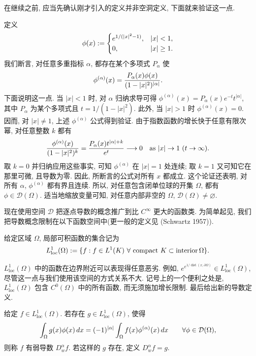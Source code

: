 在继续之前, 应当先确认刚才引入的定义并非空洞定义, 下面就来验证这一点.

\begin{Example}
\label{ex:ch01-bump-function}
定义
\[
\MathBookFormulaID{formula-ch01-bump-function}
\phi(x):=\begin{cases}
e^{1/(|x|^2-1)},&|x|<1,\\
0,&|x|\geq1.
\end{cases}
\]
我们断言, 对任意多重指标 $\alpha$, 都存在某个多项式 $P_\alpha$ 使
\[
\MathBookFormulaID{formula-ch01-bump-derivative-form}
\phi^{(\alpha)}(x)=\frac{P_\alpha(x)\phi(x)}{(1-|x|^2)^{|\alpha|}}.
\]
下面说明这一点. 当 $|x|<1$ 时, 对 $\alpha$ 归纳求导可得 $\phi^{(\alpha)}(x)=P_\alpha(x)e^{-t}t^{|\alpha|}$, 其中 $P_\alpha$ 为某个多项式且 $t=1/(1-|x|^2)$. 此外, 当 $|x|>1$ 时 $\phi^{(\alpha)}(x)=0$. 因而, 对 $|x|\neq1$, 上述 $\phi^{(\alpha)}$ 公式得到验证. 由于指数函数的增长快于任意有限次幂, 对任意整数 $k$ 都有
\[
\MathBookFormulaID{formula-ch01-bump-boundary-decay}
\frac{\phi^{(\alpha)}(x)}{(1-|x|^2)^k}
=\frac{P_\alpha(x)t^{|\alpha|+k}}{e^t}\longrightarrow0
\quad\text{as }|x|\to1\ (t\to\infty).
\]
取 $k=0$ 并归纳应用这些事实, 可知 $\phi^{(\alpha)}$ 在 $|x|=1$ 处连续; 取 $k=1$ 又可知它在那里可微, 且导数为零. 因此, 所断言的公式对所有 $x$ 都成立. 这个论证还表明, 对所有 $\alpha$, $\phi^{(\alpha)}$ 都有界且连续. 所以, 对任意包含闭单位球的开集 $\Omega$, 都有 $\phi\in\mathcal D(\Omega)$. 适当地缩放变量可知, 对任意内部非空的 $\Omega$, $\mathcal D(\Omega)\neq\varnothing$.
\end{Example}

现在使用空间 $\mathcal D$ 把逐点导数的概念推广到比 $C^\infty$ 更大的函数类. 为简单起见, 我们把导数概念限制在以下函数空间中(更一般的定义见 (Schwartz 1957)).

\begin{Definition}
\label{def:ch01-locally-integrable}
给定区域 $\Omega$, 局部可积函数的集合记为
\[
\MathBookFormulaID{formula-ch01-locally-integrable-space}
L_{\mathrm{loc}}^1(\Omega):=
\{f:f\in L^1(K)\ \forall\text{ compact }K\subset\operatorname{interior}\Omega\}.
\]
\end{Definition}

$L_{\mathrm{loc}}^1(\Omega)$ 中的函数在边界附近可以表现得任意恶劣. 例如, $e^{e^{1/\operatorname{dist}(x,\partial\Omega)}}\in L_{\mathrm{loc}}^1(\Omega)$, 尽管这一点与我们使用该空间的方式关系不大. 记号上的一个便利之处是, $L_{\mathrm{loc}}^1(\Omega)$ 包含 $C^0(\Omega)$ 中的所有函数, 而无须施加增长限制. 最后给出新的导数定义.

\begin{Definition}
\label{def:ch01-weak-derivative}
给定 $f\in L_{\mathrm{loc}}^1(\Omega)$. 若存在 $g\in L_{\mathrm{loc}}^1(\Omega)$, 使得
\[
\MathBookFormulaID{formula-ch01-weak-derivative-definition}
\int_\Omega g(x)\phi(x)\,dx
=(-1)^{|\alpha|}\int_\Omega f(x)\phi^{(\alpha)}(x)\,dx
\qquad\forall\phi\in\mathcal D(\Omega),
\]
则称 $f$ 有弱导数 $D_w^\alpha f$. 若这样的 $g$ 存在, 定义 $D_w^\alpha f=g$.
\end{Definition}

